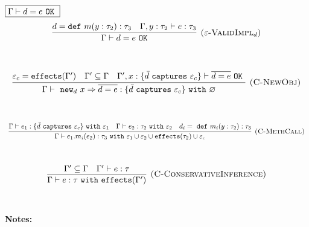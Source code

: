 \documentclass{llncs}
\newcommand{\keywadj}[1]{\mathtt{#1}}
\newcommand{\keyw}[1]{\keywadj{#1}~}
\begin{document}
$\fbox{$\Gamma \vdash d = e~\keyw{OK}$}$
\[
\begin{array}{c}
\infer[\textsc{($\varepsilon$-ValidImpl$_d$)}]
	{\Gamma \vdash d = e~\keywadj{OK}}
	{d = \keyw{def} m(y : \tau_2) : \tau_3 & \Gamma, y : \tau_2 \vdash e : \tau_3}
	\\[5ex]
\end{array}
\]

\fbox{$\Gamma \vdash e : \tau~\keyw{with} \varepsilon$}

\[
\begin{array}{c}
\infer[\textsc{(C-NewObj)}]
	{\Gamma \vdash~\keywadj{new}_d~x \Rightarrow \overline{d = e} : \{  \bar d~\keyw{captures} \varepsilon_c \} ~\keyw{with} \varnothing }
	{\varepsilon_c = \keywadj{effects}(\Gamma') & \Gamma' \subseteq \Gamma & \Gamma', x : \{ \bar d~\keyw {captures} \varepsilon_c \} \vdash \overline{d = e}~\keyw{OK}} \\[5ex]
\end{array}
\]

\[
\begin{array}{c}
\infer[\textsc{(C-MethCall)}]
	{\Gamma \vdash e_1.m_i(e_2) : \tau_3~ \keyw{with} \varepsilon_1 \cup \varepsilon_2 \cup \keywadj{effects}(\tau_2) \cup \varepsilon_c}
	{\Gamma \vdash e_1 : \{ \bar d~\keyw{captures} \varepsilon_c \}~\keyw{with} \varepsilon_1 & \Gamma \vdash e_2:\tau_2~\keyw{with} \varepsilon_2&d_i =~\keyw{def} m_i(y:\tau_2):\tau_3 } \\[5ex]
\end{array}
\]

\[
\begin{array}{c}
\infer[\textsc{(C-ConservativeInference)}]
	{\Gamma \vdash e : \tau ~\keyw{with} \keywadj{effects}(\Gamma') }
	{\Gamma' \subseteq \Gamma & \Gamma' \vdash e : \tau } \\[5ex]
\end{array}
\]

\noindent \textbf{Notes:}
\end{document}
